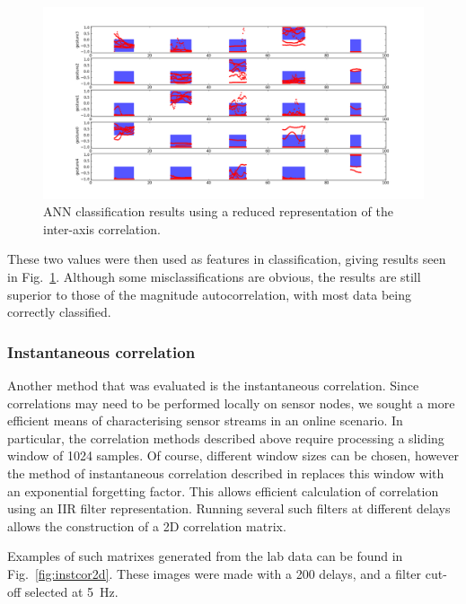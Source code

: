 \documentclass{article}
\begin{document}
\begin{figure}
\centerline{
  \includegraphics[width=4.5in]{reduced_ann.png}}
  \caption{ANN classification results using a reduced representation
    of the inter-axis correlation.}
\label{fig:reduced_ann}
\end{figure}

These two values were then used as features in classification, giving
results seen in Fig.~\ref{fig:reduced_ann}.
Although some misclassifications are obvious, the results are still
superior to those of the magnitude autocorrelation, with most data
being correctly classified.

\subsubsection{Instantaneous correlation}

Another method that was evaluated is the instantaneous correlation.
Since correlations may need to be performed locally on sensor nodes,
we sought a more efficient means of characterising sensor streams in
an online scenario.
In particular, the correlation methods described above require
processing a sliding window of 1024 samples.
Of course, different window sizes can be chosen, however the method of
instantaneous correlation described in \cite{Barbosa2012} replaces
this window with an exponential forgetting factor.
This allows efficient calculation of correlation using an IIR filter
representation.
Running several such filters at different delays allows the
construction of a 2D correlation matrix.

Examples of such matrixes generated from the lab data can be found in
Fig.~\ref{fig:instcor2d}.
These images were made with a 200 delays, and a filter cut-off
selected at 5~Hz.
\end{document}
